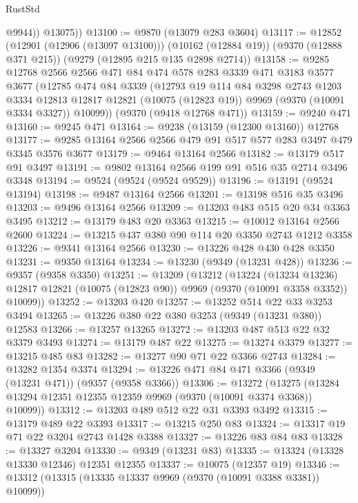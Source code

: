 \begin{lexlean}{RustStd}
\begin{coremodule}
            @9944))
        @13075))
@13100 := @9870 (@13079 @283 @3604)
@13117 := @12852
    (@12901 (@12906 (@13097 @13100)))
    (@10162 (@12884 @19))
    (@9370 (@12888 @371 @215))
    (@9279 (@12895 @215 @135 @2898 @2714))
@13158 := @9285
    @12768
    @2566
    @2566
    @471
    @84
    @474
    @578
    @283
    @3339
    @471
    @3183
    @3577
    @3677
    (@12785
      @474
      @84
      @3339
      (@12793
        @19
        @114
        @84
        @3298
        @2743
        @1203
        @3334
        @12813
        @12817
        @12821
        (@10075 (@12823 @19))
        @9969
        (@9370 (@10091 @3334 @3327))
        @10099))
    (@9370 (@9418 @12768 @471))
@13159 := @9240 @471
@13160 := @9245 @471
@13164 := @9238 (@13159 (@12300 @13160)) @12768
@13177 := @9285 @13164 @2566 @2566 @479 @91 @517 @577 @283 @3497 @479 @3345 @3576 @3677
@13179 := @9464 @13164 @2566
@13182 := @13179 @517 @91 @3497
@13191 := @9802 @13164 @2566 @199 @91 @516 @35 @2714 @3496 @3348
@13194 := @9524 (@9524 (@9524 @9529))
@13196 := @13191 (@9524 @13194)
@13198 := @9487 @13164 @2566
@13201 := @13198 @516 @35 @3496
@13203 := @9496 @13164 @2566
@13209 := @13203 @483 @515 @20 @34 @3363 @3495
@13212 := @13179 @483 @20 @3363
@13215 := @10012 @13164 @2566 @2600
@13224 := @13215 @437 @380 @90 @114 @20 @3350 @2743 @1212 @3358
@13226 := @9341 @13164 @2566
@13230 := @13226 @428 @430 @428 @3350
@13231 := @9350 @13164
@13234 := @13230 (@9349 (@13231 @428))
@13236 := @9357 (@9358 @3350)
@13251 := @13209
    (@13212
      (@13224
        (@13234 @13236)
        @12817
        @12821
        (@10075 (@12823 @90))
        @9969
        (@9370 (@10091 @3358 @3352))
        @10099))
@13252 := @13203 @420
@13257 := @13252 @514 @22 @33 @3253 @3494
@13265 := @13226 @380 @22 @380 @3253 (@9349 (@13231 @380)) @12583
@13266 := @13257 @13265
@13272 := @13203 @487 @513 @22 @32 @3379 @3493
@13274 := @13179 @487 @22
@13275 := @13274 @3379
@13277 := @13215 @485 @83
@13282 := @13277 @90 @71 @22 @3366 @2743
@13284 := @13282 @1354 @3374
@13294 := @13226 @471 @84 @471 @3366 (@9349 (@13231 @471)) (@9357 (@9358 @3366))
@13306 := @13272
    (@13275 (@13284 @13294 @12351 @12355 @12359 @9969 (@9370 (@10091 @3374 @3368)) @10099))
@13312 := @13203 @489 @512 @22 @31 @3393 @3492
@13315 := @13179 @489 @22 @3393
@13317 := @13215 @250 @83
@13324 := @13317 @19 @71 @22 @3204 @2743 @1428 @3388
@13327 := @13226 @83 @84 @83
@13328 := @13327 @3204
@13330 := @9349 (@13231 @83)
@13335 := @13324 (@13328 @13330 @12346) @12351 @12355
@13337 := @10075 (@12357 @19)
@13346 := @13312 (@13315 (@13335 @13337 @9969 (@9370 (@10091 @3388 @3381)) @10099))

\end{coremodule}
\end{lexlean}
